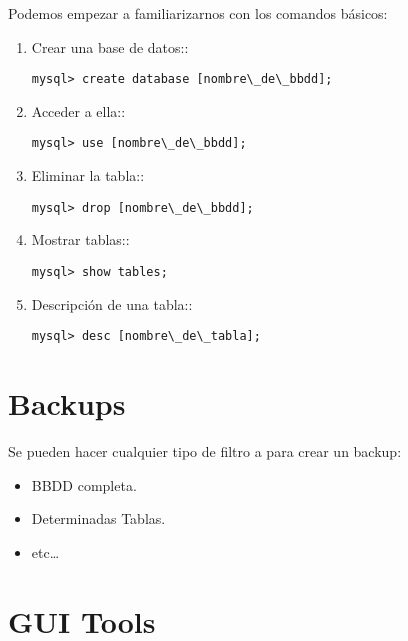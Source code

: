 \documentclass[11pt]{article}
\begin{document}
\par Podemos empezar a familiarizarnos con los comandos básicos:

\begin{enumerate}
    \item Crear una base de datos::
\begin{lstlisting}[style=Shell]
mysql> create database [nombre\_de\_bbdd];
\end{lstlisting}

    \item Acceder a ella::
\begin{lstlisting}[style=Shell]
mysql> use [nombre\_de\_bbdd];
\end{lstlisting}
    
    \item Eliminar la tabla::
\begin{lstlisting}[style=Shell]
mysql> drop [nombre\_de\_bbdd];
\end{lstlisting}
    
    \item Mostrar tablas::
\begin{lstlisting}[style=Shell]
mysql> show tables;
\end{lstlisting}

    \item Descripción de una tabla::
\begin{lstlisting}[style=Shell]
mysql> desc [nombre\_de\_tabla];
\end{lstlisting}

\end{enumerate}

\section{Backups}
\label{sec:backups}

\par Se pueden hacer cualquier tipo de filtro a para crear un backup:

\begin{itemize}
	\item BBDD completa.
	\item Determinadas Tablas.
	\item etc\ldots
\end{itemize}

\section{GUI Tools}
\label{sec:gui-tools}
\end{document}
